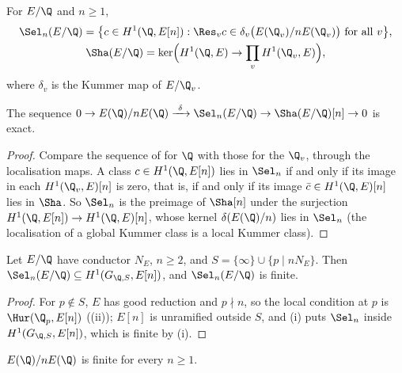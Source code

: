 \begin{definition}\label{def:galcoh:selmer-sha}
For $E/\Q$ and $n\ge1$,
\begin{gather*}
\Sel_n(E/\Q)=\bigl\{c\in H^1(\Q,E[n]):\Res_vc\in\delta_v\bigl(E(\Q_v)/nE(\Q_v)\bigr)\text{ for all }v\bigr\},\\
\Sha(E/\Q)=\ker\Bigl(H^1(\Q,E)\to\prod_vH^1(\Q_v,E)\Bigr),
\end{gather*}
where $\delta_v$ is the Kummer map of $E/\Q_v$.
\end{definition}

\begin{proposition}\label{prop:galcoh:selmer-sha}
The sequence $0\to E(\Q)/nE(\Q)\xrightarrow{\ \delta\ }\Sel_n(E/\Q)\to\Sha(E/\Q)[n]\to0$ is exact.
\end{proposition}

\begin{proof}
Compare the sequence of  for $\Q$ with those for the $\Q_v$, through the localisation maps. A class $c\in H^1(\Q,E[n])$ lies in $\Sel_n$
if and only if its image in each $H^1(\Q_v,E)[n]$ is zero, that is, if and only if its image $\bar c\in H^1(\Q,E)[n]$ lies in $\Sha$. So $\Sel_n$ is the preimage of
$\Sha[n]$ under the surjection $H^1(\Q,E[n])\to H^1(\Q,E)[n]$, whose kernel $\delta(E(\Q)/n)$ lies in $\Sel_n$ (the localisation of a global Kummer class is a local
Kummer class).
\end{proof}

\begin{theorem}\label{thm:galcoh:selmer-finite}
Let $E/\Q$ have conductor $N_E$, $n\ge2$, and $S=\{\infty\}\cup\{p\mid nN_E\}$. Then $\Sel_n(E/\Q)\subseteq H^1(G_{\Q,S},E[n])$, and $\Sel_n(E/\Q)$ is finite.
\end{theorem}

\begin{proof}
For $p\notin S$, $E$ has good reduction and $p\nmid n$, so the local condition at $p$ is $\Hur(\Q_p,E[n])$ ((ii)); $E[n]$ is unramified outside $S$,
and (i) puts $\Sel_n$ inside $H^1(G_{\Q,S},E[n])$, which is finite by (i).
\end{proof}

\begin{corollary}\label{cor:galcoh:weak-mw}
$E(\Q)/nE(\Q)$ is finite for every $n\ge1$.
\end{corollary}

